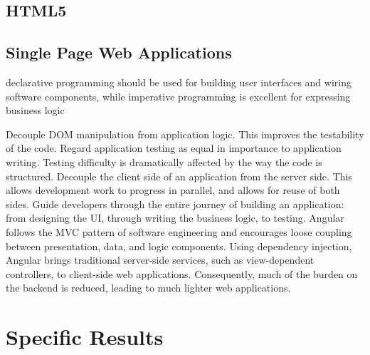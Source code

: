 \subsection{HTML5}
\label{sec:html5}

\subsection{Single Page Web Applications}

declarative programming should be used for building user interfaces and wiring software components, while imperative programming is excellent for expressing business logic


Decouple DOM manipulation from application logic. This improves the testability of the code. Regard application testing as equal in importance to application writing. Testing difficulty is dramatically affected by the way the code is structured.
Decouple the client side of an application from the server side. This allows development work to progress in parallel, and allows for reuse of both sides.
Guide developers through the entire journey of building an application: from designing the UI, through writing the business logic, to testing.
Angular follows the MVC pattern of software engineering and encourages loose coupling between presentation, data, and logic components. Using dependency injection, Angular brings traditional server-side services, such as view-dependent controllers, to client-side web applications. Consequently, much of the burden on the backend is reduced, leading to much lighter web applications.
\section{Specific Results}

